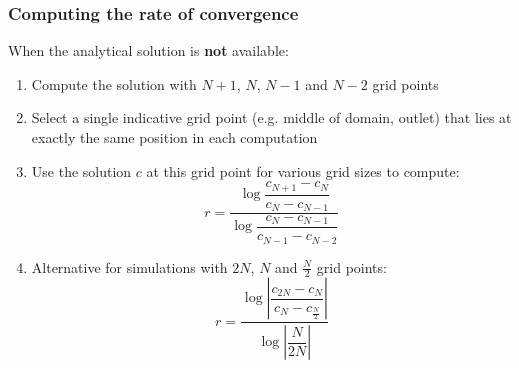 \begin{frame}[fragile]
  \frametitle{Computing the rate of convergence}
  \footnotesize\selectfont
  When the analytical solution is \textbf{not} available:
  \begin{enumerate}
  \footnotesize\selectfont
    \item Compute the solution with $N+1$, $N$, $N-1$ and $N-2$ grid points
    \item Select a single indicative grid point (e.g. middle of domain, outlet) that lies at exactly the same position in each computation
    \item Use the solution $c$ at this grid point for various grid sizes to compute:
    \[\displaystyle
      r = \dfrac{\log \dfrac{c_{N+1}  - c_N}{c_N - c_{N-1}}} {\log \dfrac{c_N - c_{N-1}}{c_{N-1} - c_{N-2}}}
    \]
    \item Alternative for simulations with $2N$, $N$ and $\frac{N}{2}$ grid points:
    \[\displaystyle
     r = \dfrac { \log \left|\dfrac{c_{2N}  - c_N}{c_N - c_{\frac{N}{2}} }\right|} {\log \left|\dfrac{N}{2N}\right|}
  \]
   \end{enumerate}
\end{frame}


